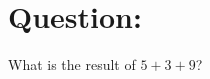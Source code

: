 \documentclass{article}
\begin{document}
\section{Question:}
What is the result of \( 5 + 3 + 9 \)?
\end{document}
